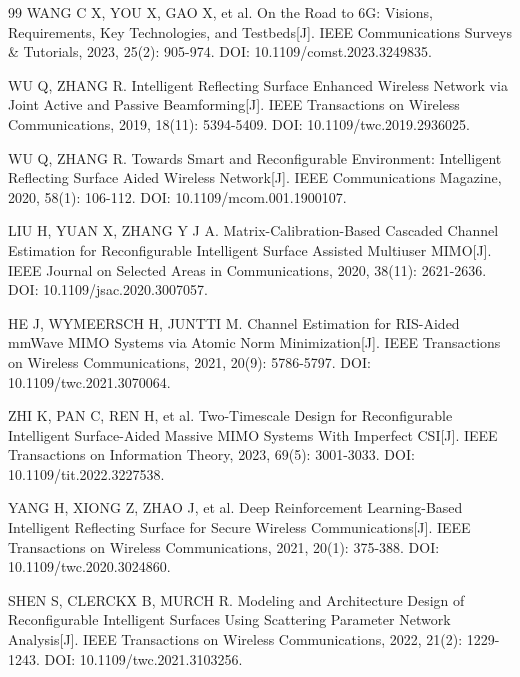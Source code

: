 \begin{thebibliography}{99}
WANG C X, YOU X, GAO X, et al. On the Road to 6G: Visions, Requirements, Key Technologies, and Testbeds[J]. IEEE Communications Surveys \& Tutorials, 2023, 25(2): 905-974. DOI: 10.1109/comst.2023.3249835.

WU Q, ZHANG R. Intelligent Reflecting Surface Enhanced Wireless Network via Joint Active and Passive Beamforming[J]. IEEE Transactions on Wireless Communications, 2019, 18(11): 5394-5409. DOI: 10.1109/twc.2019.2936025.

WU Q, ZHANG R. Towards Smart and Reconfigurable Environment: Intelligent Reflecting Surface Aided Wireless Network[J]. IEEE Communications Magazine, 2020, 58(1): 106-112. DOI: 10.1109/mcom.001.1900107.

LIU H, YUAN X, ZHANG Y J A. Matrix-Calibration-Based Cascaded Channel Estimation for Reconfigurable Intelligent Surface Assisted Multiuser MIMO[J]. IEEE Journal on Selected Areas in Communications, 2020, 38(11): 2621-2636. DOI: 10.1109/jsac.2020.3007057.

HE J, WYMEERSCH H, JUNTTI M. Channel Estimation for RIS-Aided mmWave MIMO Systems via Atomic Norm Minimization[J]. IEEE Transactions on Wireless Communications, 2021, 20(9): 5786-5797. DOI: 10.1109/twc.2021.3070064.

ZHI K, PAN C, REN H, et al. Two-Timescale Design for Reconfigurable Intelligent Surface-Aided Massive MIMO Systems With Imperfect CSI[J]. IEEE Transactions on Information Theory, 2023, 69(5): 3001-3033. DOI: 10.1109/tit.2022.3227538.

YANG H, XIONG Z, ZHAO J, et al. Deep Reinforcement Learning-Based Intelligent Reflecting Surface for Secure Wireless Communications[J]. IEEE Transactions on Wireless Communications, 2021, 20(1): 375-388. DOI: 10.1109/twc.2020.3024860.

SHEN S, CLERCKX B, MURCH R. Modeling and Architecture Design of Reconfigurable Intelligent Surfaces Using Scattering Parameter Network Analysis[J]. IEEE Transactions on Wireless Communications, 2022, 21(2): 1229-1243. DOI: 10.1109/twc.2021.3103256.


\end{thebibliography}
